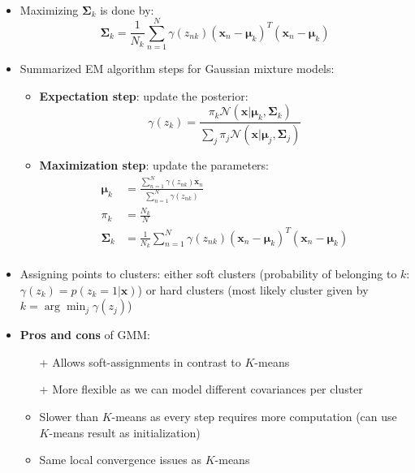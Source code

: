 \begin{itemize}
\begin{equation*}
\begin{split}
		\end{split}
	\end{equation*}
	\item Maximizing $\bm{\Sigma}_k$ is done by:
	$$\bm{\Sigma}_k = \frac{1}{N_k} \sum\limits_{n=1}^{N} \gamma\left(z_{nk}\right)\left(\bm{x}_n - \bm{\mu}_k\right)^T\left(\bm{x}_n - \bm{\mu}_k\right)$$
	\item Summarized EM algorithm steps for Gaussian mixture models: 
	\begin{itemize}
		\item \textbf{Expectation step}: update the posterior:
		$$\gamma\left(z_{k}\right) = \frac{\pi_k \mathcal{N}\left(\bm{x}|\bm{\mu}_k, \bm{\Sigma}_k\right)}{\sum_j \pi_j \mathcal{N}\left(\bm{x}|\bm{\mu}_j, \bm{\Sigma}_j\right)}$$
		\item \textbf{Maximization step}: update the parameters:
		\begin{equation*}
			\begin{split}
				\bm{\mu}_k & = \frac{\sum_{n=1}^{N}\gamma\left(z_{nk}\right)\bm{x}_n}{\sum_{n=1}^{N}\gamma\left(z_{nk}\right)}\\
				\pi_k & = \frac{N_k}{N}\\
				\bm{\Sigma}_k & = \frac{1}{N_k} \sum\limits_{n=1}^{N} \gamma\left(z_{nk}\right)\left(\bm{x}_n - \bm{\mu}_k\right)^T\left(\bm{x}_n - \bm{\mu}_k\right)\\
			\end{split}
		\end{equation*}
	\end{itemize}
	\item Assigning points to clusters: either soft clusters (probability of belonging to $k$: $\gamma\left(z_{k}\right) = p\left(z_k=1|\bm{x}\right)$) or hard clusters (most likely cluster given by $k=\arg\min_j \gamma\left(z_j\right)$)
	\item \textbf{Pros and cons} of GMM:
	\begin{itemize}
		\item[+] Allows soft-assignments in contrast to $K$-means
		\item[+] More flexible as we can model different covariances per cluster
		\item Slower than $K$-means as every step requires more computation (can use $K$-means result as initialization)
		\item Same local convergence issues as $K$-means
	\end{itemize}
\end{itemize}
